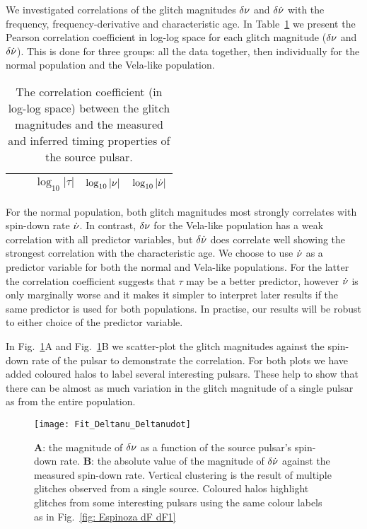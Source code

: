 \documentclass[../full_thesis/full_thesis.tex]{subfiles}
\newcommand{\thisdir}{../glitches_in_CGW}
\begin{document}
We investigated correlations of the
glitch magnitudes $\delta\nu$ and $\delta\dot{\nu}$ with the frequency,
frequency-derivative and characteristic age.
In Table~\ref{tab: correlation} we present the Pearson correlation coefficient
in log-log space for each glitch magnitude ($\delta\nu$ and $\delta\dot{\nu}$).
This is done for three groups:
all the data together, then individually for the normal population and the
Vela-like population.
\begin{table}[htb]
\begin{tabular}{l|l|ccc}
&  & $\log_{10}|\tau|$ & $\log_{10}|\nu|$ & $\log_{10}|\dot{\nu}|$ \\\hline

\end{tabular}
\caption{The correlation coefficient (in log-log space) between the glitch
magnitudes and the measured and inferred timing properties of the source pulsar.}
\label{tab: correlation}
\end{table}
For the normal population, both glitch magnitudes most strongly correlates with
spin-down rate $\dot{\nu}$. In contrast, $\delta\nu$ for the Vela-like population has
a weak correlation with all predictor variables, but $\delta\dot{\nu}$ does
correlate well showing the strongest correlation with the characteristic age.
We choose to use $\dot{\nu}$ as a predictor variable for both the normal and
Vela-like populations. For the latter the correlation coefficient suggests that
$\tau$ may be a better predictor, however $\dot{\nu}$ is only marginally
worse and it makes it simpler to interpret later results if the same predictor is
used for both populations. In practise, our results will be robust to either choice
of the predictor variable.

In Fig.~\ref{fig: extrapolation fit}A  and Fig.~\ref{fig: extrapolation fit}B
we scatter-plot
the glitch magnitudes against the spin-down rate of the pulsar to demonstrate the
correlation. For both plots we have added coloured
halos to label several interesting pulsars. These help to show that
there can be almost as much variation in the
glitch magnitude of a single pulsar as from the entire population.
\begin{figure}[htb]
\centering
\texttt{[image: Fit\_Deltanu\_Deltanudot]}
\caption{\textbf{A}: the magnitude of $\delta\nu$ as a function of the source
pulsar's spin-down rate. \textbf{B}: the absolute value of the magnitude of
$\delta\dot{\nu}$ against the measured spin-down rate. Vertical clustering is the
result of multiple glitches observed from a single source. Coloured halos
highlight glitches from some interesting pulsars using the
same colour labels as in Fig.~\ref{fig: Espinoza dF dF1}}
\label{fig: extrapolation fit}
\end{figure}
\end{document}
